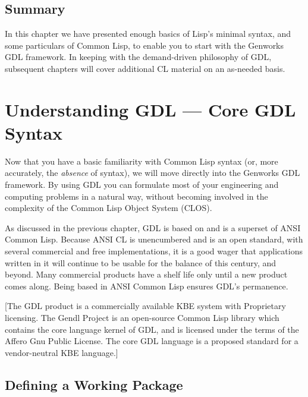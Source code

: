 \documentclass [11pt]{book}
\begin{document}
\section{Summary}

In this chapter we have presented enough basics of Lisp's
minimal syntax, and some particulars of Common Lisp, to enable you to
start with the Genworks GDL framework. In keeping with the
demand-driven philosophy of GDL, subsequent chapters will cover additional
CL material on an as-needed basis.

\chapter{Understanding GDL --- Core GDL Syntax}

\label{chap:understandinggdl---coregdlsyntax}



Now that you have a basic familiarity with Common Lisp
      syntax (or, more accurately, the \emph{absence} of syntax), we will move directly into the Genworks GDL
framework. By using GDL you can formulate most of your engineering and
computing problems in a natural way, without becoming involved in the
complexity of the Common Lisp Object System (CLOS).



As discussed in the previous chapter, GDL is based on and
is a superset of ANSI Common Lisp. Because ANSI CL is unencumbered and
is an open standard, with several commercial and free implementations,
it is a good wager that applications written in it will continue to be
usable for the balance of this century, and beyond. Many commercial
products have a shelf life only until a new product comes along. Being
based in ANSI Common Lisp ensures GDL's permanence.



[The GDL product is a commercially available KBE system
with Proprietary licensing.  The Gendl Project is an open-source
Common Lisp library which contains the core language kernel of GDL,
and is licensed under the terms of the Affero Gnu Public License. The
core GDL language is a proposed standard for a vendor-neutral KBE
language.]



\section{Defining a Working Package}

\label{sec:definingaworkingpackage}
\end{document}
